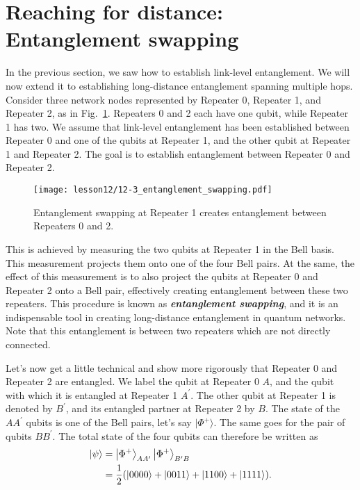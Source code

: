 \section{Reaching for distance: Entanglement swapping}
\label{sec:12-3_reaching_for_distance}

In the previous section, we saw how to establish link-level entanglement.
We will now extend it to establishing long-distance entanglement spanning multiple hops.
Consider three network nodes represented by Repeater 0, Repeater 1, and Repeater 2, as in Fig.~\ref{fig:12-3_entanglement_swapping}. Repeaters 0 and 2 each have one qubit, while Repeater 1 has two.
We assume that link-level entanglement has been established between Repeater 0 and one of the qubits at Repeater 1, and the other qubit at Repeater 1 and Repeater 2.
The goal is to establish entanglement between Repeater 0 and Repeater 2.

\begin{figure}[t]
    \centering
    \texttt{[image: lesson12/12-3\_entanglement\_swapping.pdf]}
    \caption[Entanglement swapping]{Entanglement swapping at Repeater 1 creates entanglement between Repeaters 0 and 2.}
    \label{fig:12-3_entanglement_swapping}
\end{figure}

This is achieved by measuring the two qubits at Repeater 1 in the Bell basis.
This measurement projects them onto one of the four Bell pairs.
At the same, the effect of this measurement is to also project the qubits at Repeater 0 and Repeater 2 onto a Bell pair, effectively creating entanglement between these two repeaters.
This procedure is known as \textit{\textbf{entanglement swapping}}, and it is an indispensable tool in creating long-distance entanglement in quantum networks.
Note that this entanglement is between two repeaters which are not directly connected.

Let's now get a little technical and show more rigorously that Repeater 0 and Repeater 2 are entangled.
We label the qubit at Repeater 0 $A$, and the qubit with which it is entangled at Repeater 1 $A^{\prime}$.
The other qubit at Repeater 1 is denoted by $B^{\prime}$, and its entangled partner at Repeater 2 by $B$.
The state of the $AA^{\prime}$ qubits is one of the Bell pairs, let's say $|\Phi^+\rangle$.
The same goes for the pair of qubits $BB^{\prime}$.
The total state of the four qubits can therefore be written as
\begin{align}
    \begin{aligned}
        \left| \psi \right\rangle & = \left| \Phi^{+} \right\rangle_{A A^{\prime}}\left| \Phi^{+} \right\rangle_{B^{\prime} B} \\
        & = \frac{1}{2} ( |0000\rangle+|0011\rangle+|1100\rangle+|1111\rangle ).
        \label{eq:12-3_computational_basis}
    \end{aligned}
\end{align}

